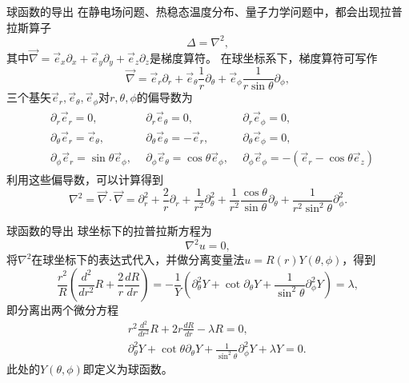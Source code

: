 \documentclass[11pt]{beamer}
\begin{document}
\begin{frame}{球函数的导出}
在静电场问题、热稳态温度分布、量子力学问题中，都会出现拉普拉斯算子
\begin{equation}
\Delta = \nabla^2,
\end{equation}
其中$\vec{\nabla} = \vec{e}_x \partial_x + \vec{e}_y \partial_y + \vec{e}_z \partial_z$是梯度算符。
在球坐标系下，梯度算符可写作
\begin{equation}
\vec{\nabla} = \vec{e}_r \partial_r + \vec{e}_\theta \frac{1}{r}\partial_\theta + \vec{e}_\phi \frac{1}{r\sin \theta} \partial_\phi,
\end{equation}
三个基矢$\vec{e}_r, \vec{e}_\theta, \vec{e}_\phi$对$r,\theta,\phi$的偏导数为
\begin{eqnarray}
\begin{aligned}
& \partial_r \vec{e}_r = 0,~~ & \partial_r \vec{e}_\theta = 0,~~ & \partial_r \vec{e}_\phi = 0, \\
& \partial_\theta \vec{e}_r = \vec{e}_\theta,~~ & \partial_\theta \vec{e}_\theta = - \vec{e}_r,~~ & \partial_\theta \vec{e}_\phi = 0, \\
& \partial_\phi \vec{e}_r = \sin \theta \vec{e}_\phi, ~~
& \partial_\phi \vec{e}_\theta = \cos \theta \vec{e}_\phi, ~~
& \partial_\phi \vec{e}_\phi = - ( \vec{e}_r - \cos \theta \vec{e}_z )
\end{aligned}
\end{eqnarray}
利用这些偏导数，可以计算得到
\begin{equation}
\nabla^2 = \vec{\nabla} \cdot \vec{\nabla}
= \partial_r^2 + \frac{2}{r} \partial_r + \frac{1}{r^2} \partial_\theta^2 + \frac{1}{r^2} \frac{\cos \theta}{\sin \theta} \partial_\theta + \frac{1}{r^2 \sin^2 \theta} \partial_\phi^2.
\end{equation}
\end{frame}

\begin{frame}{球函数的导出}
球坐标下的拉普拉斯方程为
\begin{equation}
\nabla^2 u = 0,
\end{equation}
将$\nabla^2$在球坐标下的表达式代入，并做分离变量法$u = R(r) Y(\theta, \phi)$，得到
\begin{equation}
\frac{r^2}{R}( \frac{d^2}{dr^2}R + \frac{2}{r}\frac{dR}{dr} ) 
= - \frac{1}{Y}( \partial_\theta^2 Y + \cot \partial_\theta Y + \frac{1}{\sin^2 \theta} \partial_\phi^2 Y ) = \lambda,
\end{equation}
即分离出两个微分方程
\begin{eqnarray}
&& r^2 \frac{d^2}{dr^2}R + 2r \frac{dR}{dr} - \lambda R = 0, \\
&& \partial_\theta^2 Y + \cot \theta \partial_\theta Y + \frac{1}{\sin^2 \theta} \partial_\phi^2 Y + \lambda Y = 0.
\end{eqnarray}
此处的$Y(\theta, \phi)$即定义为球函数。
\end{frame}
\end{document}
